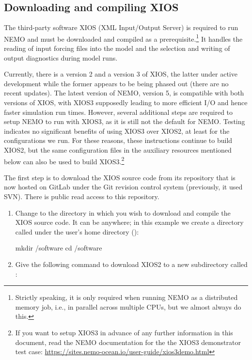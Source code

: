 \subsection{Downloading and compiling XIOS}
\label{sec:tutor-xios}

The third-party software XIOS (XML Input/Output Server) is required to run NEMO and must be downloaded and compiled as a prerequisite.\footnote{
    Strictly speaking, it is only required when running NEMO as a distributed memory job, i.e., in parallel across multiple CPUs, but we almost always do this.
}
It handles the reading of input forcing files into the model and the selection and writing of output diagnostics during model runs.

Currently, there is a version 2 and a version 3 of XIOS, the latter under active development while the former appears to be being phased out (there are no recent updates).
The latest version of NEMO, version 5, is compatible with both versions of XIOS, with XIOS3 supposedly leading to more efficient I/O and hence faster simulation run times.
However, several additional steps are required to setup NEMO to run with XIOS3, as it is still not the default for NEMO.
Testing indicates no significant benefits of using XIOS3 over XIOS2, at least for the configurations we run.
For these reasons, these instructions continue to build XIOS2, but the same configuration files in the auxiliary resources mentioned below can also be used to build XIOS3.\footnote{
    If you want to setup XIOS3 in advance of any further information in this document, read the NEMO documentation for the the XIOS3 demonstrator test case: \url{https://sites.nemo-ocean.io/user-guide/xios3demo.html}
}

The first step is to download the XIOS source code from its repository that is now hosted on GitLab under the Git revision control system (previously, it used SVN).
There is public read access to this repository.

\begin{enumerate}

    \item Change to the directory in which you wish to download and compile the XIOS source code.
        It can be anywhere; in this example we create a directory called  under the user's home directory ():

\begin{VerbatimCMD}
mkdir  /software
cd /software
\end{VerbatimCMD}
    \item Give the following command to download XIOS2 to a new subdirectory called :
\end{enumerate}


